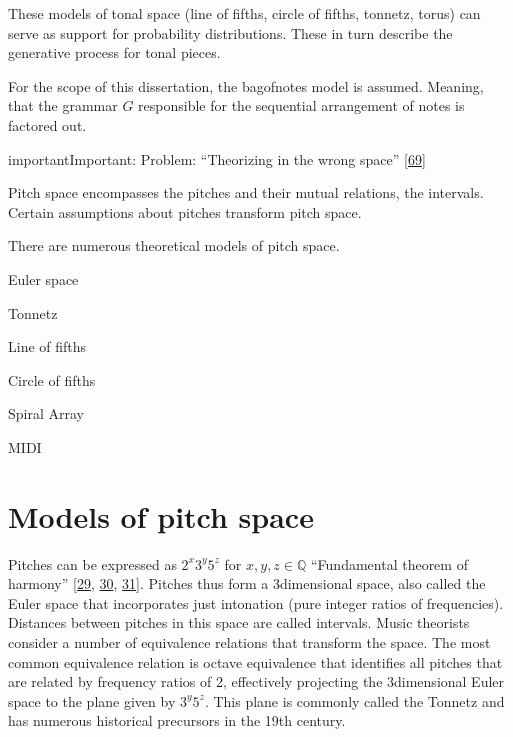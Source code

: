 \documentclass[letterpaper,10pt,english]{sphinxmanual}
\begin{document}
\sphinxAtStartPar
These models of tonal space (line of fifths, circle of fifths, tonnetz,
torus) can serve as support for probability distributions. These in turn
describe the generative process for tonal pieces.

\sphinxAtStartPar
For the scope of this dissertation, the bag\sphinxhyphen{}of\sphinxhyphen{}notes model is assumed.
Meaning, that the grammar \(G\) responsible for the sequential
arrangement of notes is factored out.

\begin{sphinxadmonition}{important}{Important:}
\sphinxAtStartPar
Problem: “Theorizing in the wrong space” {[}\hyperlink{cite.8_bibliography:id10}{69}{]}
\end{sphinxadmonition}

\sphinxAtStartPar
Pitch space encompasses the pitches and their mutual relations, the
intervals. Certain assumptions about pitches transform pitch space.

\sphinxAtStartPar
There are numerous theoretical models of pitch space.

\begin{DUlineblock}{0em}
\item[] \sphinxhyphen{} Euler space
\item[] \sphinxhyphen{} Tonnetz
\item[] \sphinxhyphen{} Line of fifths
\item[] \sphinxhyphen{} Circle of fifths
\item[] \sphinxhyphen{} Spiral Array
\item[] \sphinxhyphen{} MIDI
\end{DUlineblock}


\section{Models of pitch space}
\label{\detokenize{5_notes:models-of-pitch-space}}
\sphinxAtStartPar
Pitches can be expressed as \(2^x3^y5^z\) for
\(x,y,z\in \mathbb Q\) “Fundamental theorem of harmony”
{[}\hyperlink{cite.8_bibliography:id46}{29}, \hyperlink{cite.8_bibliography:id47}{30}, \hyperlink{cite.8_bibliography:id45}{31}{]}.
Pitches thus form a
3\sphinxhyphen{}dimensional space, also called the Euler space that incorporates just
intonation (pure integer ratios of frequencies). Distances between
pitches in this space are called intervals. Music theorists consider a
number of equivalence relations that transform the space. The most
common equivalence relation is octave equivalence that identifies all
pitches that are related by frequency ratios of 2, effectively
projecting the 3\sphinxhyphen{}dimensional Euler space to the plane given by
\(3^y5^z\). This plane is commonly called the Tonnetz and has
numerous historical precursors in the 19th century.
\end{document}

